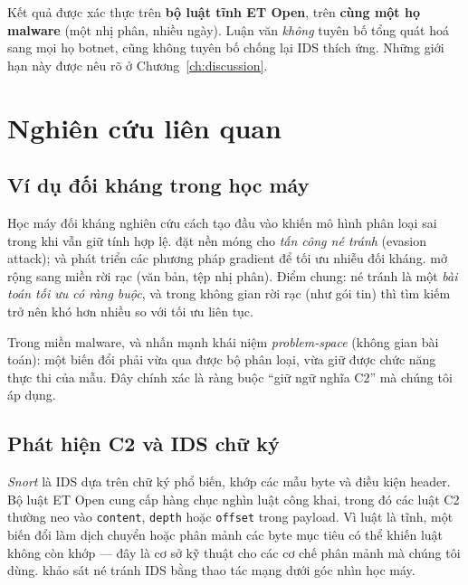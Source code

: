 \documentclass[12pt,a4paper]{report}
\newcommand{\Snort}{\textit{Snort}}
\begin{document}
Kết quả được xác thực trên \textbf{bộ luật tĩnh ET Open}, trên \textbf{cùng một họ
malware} (một nhị phân, nhiều ngày). Luận văn \emph{không} tuyên bố tổng quát hoá
sang mọi họ botnet, cũng không tuyên bố chống lại IDS thích ứng. Những giới hạn này
được nêu rõ ở Chương~\ref{ch:discussion}.

\chapter{Nghiên cứu liên quan}
\label{ch:related}

\section{Ví dụ đối kháng trong học máy}

Học máy đối kháng nghiên cứu cách tạo đầu vào khiến mô hình phân loại sai trong khi
vẫn giữ tính hợp lệ. \citet{biggio2013evasion} đặt nền móng cho \emph{tấn công né
tránh} (evasion attack); \citet{goodfellow2014explaining} và
\citet{carlini2016towards} phát triển các phương pháp gradient để tối ưu nhiễu đối
kháng. \citet{papernot2016limits} mở rộng sang miền rời rạc (văn bản, tệp nhị phân).
Điểm chung: né tránh là một \emph{bài toán tối ưu có ràng buộc}, và trong không gian
rời rạc (như gói tin) thì tìm kiếm trở nên khó hơn nhiều so với tối ưu liên tục.

Trong miền malware, \citet{pierazzi2019intriguing} và \citet{demetrio2020intriguing}
nhấn mạnh khái niệm \emph{problem-space} (không gian bài toán): một biến đổi phải vừa
qua được bộ phân loại, vừa giữ được chức năng thực thi của mẫu. Đây chính xác là ràng
buộc ``giữ ngữ nghĩa C2'' mà chúng tôi áp dụng.

\section{Phát hiện C2 và IDS chữ ký}

\Snort{} \citep{snort_project} là IDS dựa trên chữ ký phổ biến, khớp các mẫu byte và
điều kiện header. Bộ luật ET Open \citep{emerging_threats} cung cấp hàng chục nghìn
luật công khai, trong đó các luật C2 thường neo vào \texttt{content}, \texttt{depth}
hoặc \texttt{offset} trong payload. Vì luật là tĩnh, một biến đổi làm dịch chuyển hoặc
phân mảnh các byte mục tiêu có thể khiến luật không còn khớp — đây là cơ sở kỹ thuật
cho các cơ chế phân mảnh mà chúng tôi dùng. \citet{silva2017ids} khảo sát né tránh IDS
bằng thao tác mạng dưới góc nhìn học máy.
\end{document}
